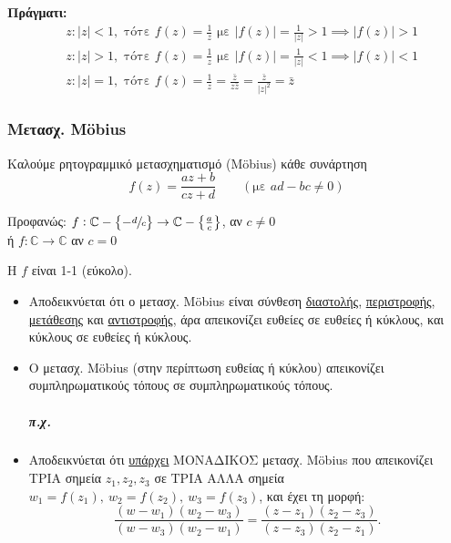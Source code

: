 \documentclass[12pt,a4paper,titlepage,fleqn]{article}
\begin{document}
     \textbf{Πράγματι:}
     \begin{align*}
     & z: |z| < 1, \text{ τότε } f(z) = \frac{1}{z} \text{ με } \left|f(z)\right|
     = \frac{1}{|z|}>1 \implies \left|f(z)\right|> 1 \\
     & z: |z| > 1, \text{ τότε } f(z) = \frac{1}{z} \text{ με } \left|f(z)\right|
      = \frac{1}{|z|}<1 \implies \left|f(z)\right|< 1 \\
     & z: |z| = 1, \text{ τότε } f(z) = \frac{1}{z} = \frac{\bar z}{z\bar z}
     = \frac{\bar z}{|z|^2} = \bar z
     \end{align*}
     
     \subsubsection{Μετασχ. M\"obius}
     Καλούμε ρητογραμμικό μετασχηματισμό (M\"obius) κάθε συνάρτηση
     \[
     f(z) = \frac{az+b}{cz+d}\qquad (\text{με } ad-bc \neq 0)
     \]
     
     Προφανώς: \( f: \mathbb C - \left\lbrace - \sfrac{d}{c}  \right\rbrace 
     \to \mathbb C  - \left\lbrace \frac{a}{c} \right\rbrace
     \), αν \( c \neq 0 \)
     \\ ή \( f: \mathbb C \to \mathbb C \) \quad αν \( c = 0 \)
    
     H \( f \) είναι 1-1 (εύκολο).
     
     \begin{itemize}
     	\item
     	Αποδεικνύεται ότι ο μετασχ. M\"obius είναι σύνθεση \underline{διαστολής},
     	\underline{περιστροφής}, \underline{μετάθεσης} και \underline{αντιστροφής},
     	άρα απεικονίζει ευθείες σε ευθείες
     	ή κύκλους, και κύκλους σε ευθείες ή κύκλους.
     	
     	\item
     	Ο μετασχ. M\"obius (στην περίπτωση ευθείας ή κύκλου) απεικονίζει
     	συμπληρωματικούς τόπους σε συμπληρωματικούς τόπους.
     	\subparagraph{π.χ.}
     	
     	\item
     	Αποδεικνύεται ότι \underline{υπάρχει} ΜΟΝΑΔΙΚΟΣ μετασχ. M\"obius που
     	απεικονίζει ΤΡΙΑ σημεία \( z_1, z_2, z_3 \) σε ΤΡΙΑ ΑΛΛΑ σημεία
     	\( w_1 = f(z_1),\ w_2 = f(z_2),\ w_3 = f(z_3) \), και έχει τη μορφή:
     	\[
     	\frac{(w-w_1)(w_2-w_3)}{(w-w_3)(w_2-w_1)}=
     	\frac{(z-z_1)(z_2-z_3)}{(z-z_3)(z_2-z_1)}.
     	\]
     \end{itemize}
     
\end{document}
